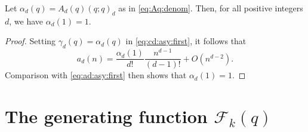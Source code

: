 \documentclass[11pt]{article}
\theoremstyle{plain}
\theoremstyle{definition}
\begin{document}
\begin{corollary}
  \label{cor:alphad:1}Let $\alpha_d (q) = A_d (q) (q ; q)_d$ as in
  \eqref{eq:Aq:denom}. Then, for all positive integers $d$, we have $\alpha_d
  (1) = 1$.
\end{corollary}

\begin{proof}
  Setting $\gamma_d (q) = \alpha_d (q)$ in \eqref{eq:cd:asy:first}, it follows
  that
  \begin{equation*}
    a_d (n) = \frac{\alpha_d (1)}{d!} \frac{n^{d - 1}}{(d - 1) !} + O (n^{d -
     2}) .
  \end{equation*}
  Comparison with \eqref{eq:ad:asy:first} then shows that $\alpha_d (1) = 1$.
\end{proof}

\section{The generating function \texorpdfstring{$\mathcal{F}_k (q)$}{Fk(q)}}\label{sec:Fk}
\end{document}
